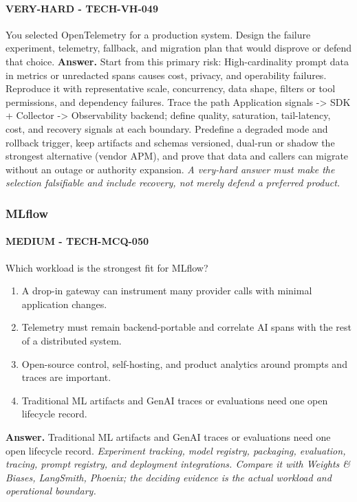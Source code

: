 \paragraph{VERY-HARD - TECH-VH-049} You selected OpenTelemetry for a production system. Design the failure experiment, telemetry, fallback, and migration plan that would disprove or defend that choice.
\textbf{Answer.} Start from this primary risk: High-cardinality prompt data in metrics or unredacted spans causes cost, privacy, and operability failures. Reproduce it with representative scale, concurrency, data shape, filters or tool permissions, and dependency failures. Trace the path Application signals -> SDK + Collector -> Observability backend; define quality, saturation, tail-latency, cost, and recovery signals at each boundary. Predefine a degraded mode and rollback trigger, keep artifacts and schemas versioned, dual-run or shadow the strongest alternative (vendor APM), and prove that data and callers can migrate without an outage or authority expansion.
\textit{A very-hard answer must make the selection falsifiable and include recovery, not merely defend a preferred product.}
\subsubsection*{MLflow}
\paragraph{MEDIUM - TECH-MCQ-050} Which workload is the strongest fit for MLflow?
\begin{enumerate}[label=\Alph*.]
\item A drop-in gateway can instrument many provider calls with minimal application changes.
\item Telemetry must remain backend-portable and correlate AI spans with the rest of a distributed system.
\item Open-source control, self-hosting, and product analytics around prompts and traces are important.
\item Traditional ML artifacts and GenAI traces or evaluations need one open lifecycle record.
\end{enumerate}
\textbf{Answer.} Traditional ML artifacts and GenAI traces or evaluations need one open lifecycle record.
\textit{Experiment tracking, model registry, packaging, evaluation, tracing, prompt registry, and deployment integrations. Compare it with Weights \& Biases, LangSmith, Phoenix; the deciding evidence is the actual workload and operational boundary.}

